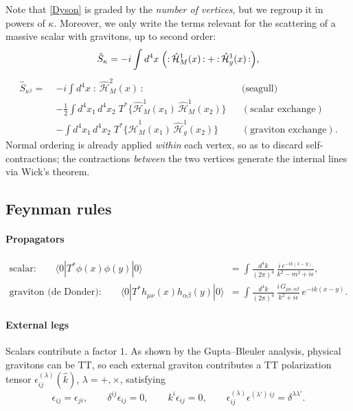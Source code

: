 \documentclass[12pt,a4paper,oneside]{article}
\numberwithin{equation}{section}   %
\begin{document}
Note that \eqref{Dyson} is graded by the \emph{number of vertices}, but we
regroup it in powers of $\kappa$. Moreover, we only write the terms relevant
for the scattering of a massive scalar with gravitons, up to second order:
\begin{equation}\label{Skappa}
\hat{S}_{\kappa}
=-i\int d^4x\;\Bigl({:}\,\hat{\mathcal{H}}_M^{1}(x)\,{:}
+{:}\,\hat{\mathcal{H}}_g^{1}(x)\,{:}\Bigr) ,
\end{equation}
\begin{equation}\label{Skappa2}
\begin{aligned}
\hat{S}_{\kappa^2}
=\;&-i\int d^4x\;{:}\,\hat{\mathcal{H}}_M^{2}(x)\,{:}
&&\text{(seagull)}\\[0.25cm]
&-\frac12\int d^4x_1\, d^4x_2\;
T^*\bigl\{\hat{\mathcal{H}}_M^{1}(x_1)\,\hat{\mathcal{H}}_M^{1}(x_2)\bigr\}
&&(\text{scalar exchange})\\[0.25cm]
&-\int d^4x_1\, d^4x_2\;
T^*\bigl\{\hat{\mathcal{H}}_M^{1}(x_1)\,\hat{\mathcal{H}}_g^{1}(x_2)\bigr\}
&&(\text{graviton exchange}).
\end{aligned}
\end{equation}
Normal ordering is already applied \emph{within} each vertex, so as to discard
self-contractions; the contractions \emph{between} the two vertices generate
the internal lines via Wick's theorem.

\subsection{Feynman rules}

\paragraph{Propagators}
\begin{align}
\text{scalar:}\qquad
\langle 0|T^{*}\phi(x)\phi(y)|0\rangle
&=\int\!\frac{d^4k}{(2\pi)^4}\,
\frac{i\,e^{-ik(x-y)}}{k^{2}-m^{2}+i\epsilon},\\[0.3cm]
\text{graviton (de Donder):}\qquad
\langle 0|T^{*}h_{\mu\nu}(x)h_{\alpha\beta}(y)|0\rangle
&=\int\!\frac{d^4k}{(2\pi)^4}\,
\frac{i\,G_{\mu\nu,\alpha\beta}}{k^{2}+i\epsilon}\,e^{-ik(x-y)} .
\end{align}

\paragraph{External legs}
Scalars contribute a factor $1$. As shown by the Gupta--Bleuler analysis,
physical gravitons can be TT, so each external graviton contributes a TT
polarization tensor $\epsilon_{ij}^{(\lambda)}(\hat k)$, $\lambda=+,\times$,
satisfying
\begin{equation}
    \epsilon_{ij}=\epsilon_{ji},\qquad
    \delta^{ij}\epsilon_{ij}=0,\qquad
    k^{i}\epsilon_{ij}=0,\qquad
    \epsilon^{(\lambda)}_{ij}\epsilon^{(\lambda')\,ij}=\delta^{\lambda\lambda'} .
\end{equation}
\end{document}
